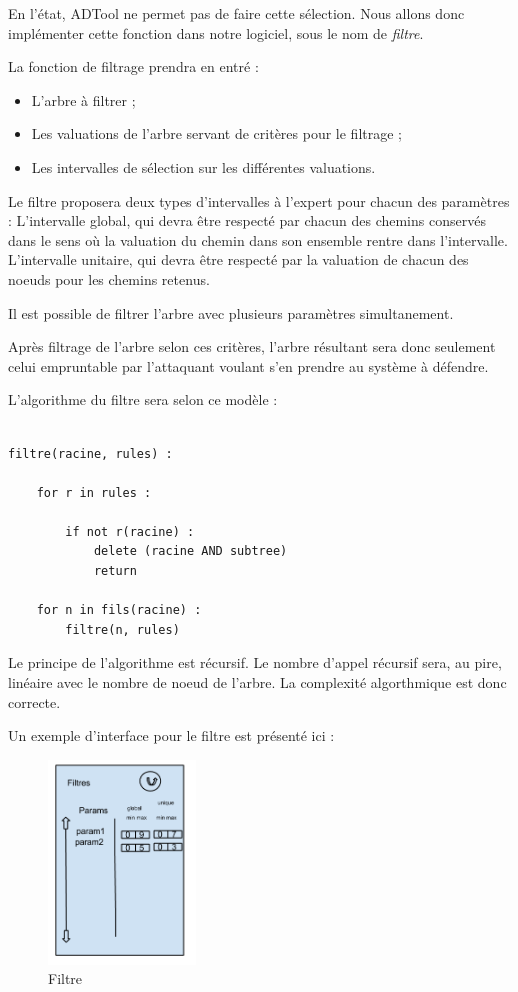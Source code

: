 		En l'état, ADTool ne permet pas de faire cette sélection. Nous allons donc implémenter cette fonction dans notre logiciel, sous le nom de \textit{filtre}.

		La fonction de filtrage prendra en entré : 
		\begin{itemize}
		\item L'arbre à filtrer ;
		\item Les valuations de l'arbre servant de critères pour le filtrage ;
		\item Les intervalles de sélection sur les différentes valuations.
		\end{itemize}

		Le filtre proposera deux types d'intervalles à l'expert pour chacun des paramètres : 
		L'intervalle global, qui devra être respecté par chacun des chemins conservés dans le sens où la valuation du chemin dans son ensemble rentre dans l'intervalle.
		L'intervalle unitaire, qui devra être respecté par la valuation de chacun des noeuds pour les chemins retenus.

		Il est possible de filtrer l'arbre avec plusieurs paramètres simultanement.
		
		Après filtrage de l'arbre selon ces critères, l'arbre résultant sera donc seulement celui empruntable par l'attaquant voulant s'en prendre au système à défendre. 
		
		L'algorithme du filtre sera selon ce modèle :

		\begin{lstlisting}

filtre(racine, rules) :

	for r in rules :

		if not r(racine) :
			delete (racine AND subtree)
			return

	for n in fils(racine) :
		filtre(n, rules)

\end{lstlisting}
	
		Le principe de l'algorithme est récursif.
		Le nombre d'appel récursif sera, au pire, linéaire avec le nombre de noeud de l'arbre.
		La complexité algorthmique est donc correcte.

		Un exemple d'interface pour le filtre est présenté ici :

		\begin{figure}[h!]
			\begin{center}
				\includegraphics[width=0.35\textwidth]{figure/filtre.png}
			\end{center}
			\caption{Filtre}
			\label{fig:filtre}
		\end{figure}

